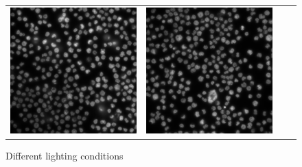 \begin{figure}[H]
\begin{tabularx}{\textwidth}{YYYY}
            \includegraphics{bilder/lightning-conditions/lightning-3.png} &
            \includegraphics{bilder/lightning-conditions/lightning-4.png}
        \end{tabularx}
    \caption{Different lighting conditions}
    \label{fig:lightning_conditions}
\end{figure}

